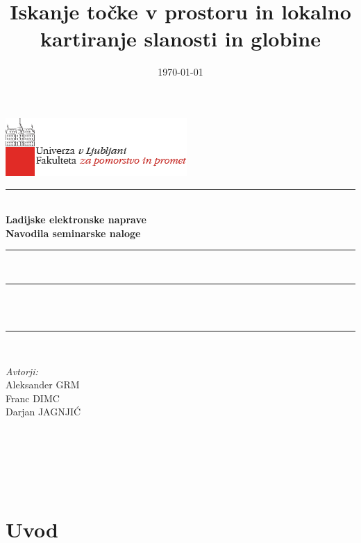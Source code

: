 \documentclass[11pt,a4]{article}
\title{Iskanje točke v prostoru in lokalno kartiranje slanosti in globine }
\date{\today}
\author{}
\makeatletter
\let\thetitle\@title
\let\thedate\@date
\makeatother
\begin{document}

\begin{titlepage}
	\centering
	\vspace*{-2cm}
    \includegraphics[scale = 0.75]{logo_FPP.png}\\[1.0 cm]
    
	\rule{\linewidth}{1 mm} \\[0.4 cm]
	{ \huge \bfseries Ladijske elektronske naprave} \\[0.5 cm]
	{ \Large \bfseries Navodila seminarske naloge}
	\rule{\linewidth}{1 mm} \\[1 cm]
	
	\rule{\linewidth}{0.5 mm} \\[0.4 cm]
	{ \large \bfseries \thetitle}\\[0.0 cm]
	\rule{\linewidth}{0.5 mm} \\[2 cm]
	
	\begin{minipage}{0.4\textwidth}
		\begin{flushleft} \large
			\emph{Avtorji:}\\[0.2 cm]
			Aleksander GRM\\
			Franc DIMC\\
			Darjan JAGNJIĆ
			\end{flushleft}
			\end{minipage}~
			\begin{minipage}{0.4\textwidth}
			\begin{flushright}
			\end{flushright}
	\end{minipage}\\[2 cm]
	
	\vfill
	
	{\large \thedate}\\[2 cm]
 
	
	
\end{titlepage}


\tableofcontents
\pagebreak


\section{Uvod}

\newpage


\end{document}
